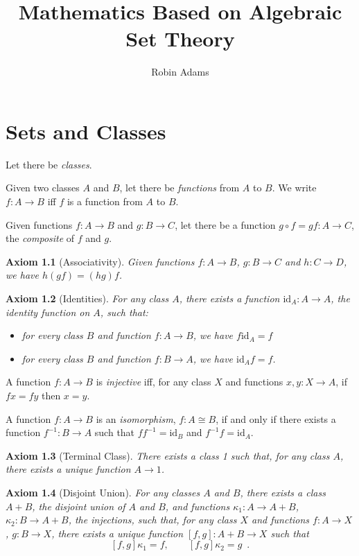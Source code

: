 \documentclass{book}
\title{Mathematics Based on Algebraic Set Theory}
\author{Robin Adams}
\newtheorem{ax}{Axiom}[chapter]
\begin{document}
\chapter{Sets and Classes}

Let there be \emph{classes}.

Given two classes $A$ and $B$, let there be \emph{functions} from $A$ to $B$. We write $f : A \rightarrow B$ iff $f$ is a function from $A$ to $B$.

Given functions $f : A \rightarrow B$ and $g : B \rightarrow C$, let there be a function $g \circ f = g f : A \rightarrow C$, the \emph{composite} of $f$ and $g$.

\begin{ax}[Associativity]
Given functions $f : A \rightarrow B$, $g : B \rightarrow C$ and $h : C \rightarrow D$, we have $h(gf) = (hg)f$.
\end{ax}

\begin{ax}[Identities]
For any class $A$, there exists a function $\mathrm{id}_A : A \rightarrow A$, the \emph{identity} function on $A$, such that:
\begin{itemize}
\item for every class $B$ and function $f : A \rightarrow B$, we have $f \mathrm{id}_A = f$
\item for every class $B$ and function $f : B \rightarrow A$, we have $\mathrm{id}_A f = f$.
\end{itemize}
\end{ax}

\begin{df}[Injective]
A function $f : A \rightarrow B$ is \emph{injective} iff, for any class $X$ and functions $x,y : X \rightarrow A$, if $fx = fy$ then $x  = y$.
\end{df}

\begin{df}[Isomorphism]
A function $f : A \rightarrow B$ is an \emph{isomorphism}, $f : A \cong B$, if and only if there exists a function $f^{-1} : B \rightarrow A$ such that $f f^{-1} = \mathrm{id}_B$ and $f^{-1} f = \mathrm{id}_A$.
\end{df}

\begin{ax}[Terminal Class]
There exists a class 1 such that, for any class $A$, there exists a unique function $A \rightarrow 1$.
\end{ax}

\begin{ax}[Disjoint Union]
For any classes $A$ and $B$, there exists a class $A + B$, the \emph{disjoint union} of $A$ and $B$, and functions $\kappa_1 : A \rightarrow A + B$, $\kappa_2 : B \rightarrow A + B$, the \emph{injections}, such that, for any class $X$ and functions $f : A \rightarrow X$, $g : B \rightarrow X$, there exists a unique function $[f,g] : A + B \rightarrow X$ such that
\[ [f,g] \kappa_1 = f, \qquad [f,g] \kappa_2 = g \enspace . \]
\end{ax}
\end{document}
